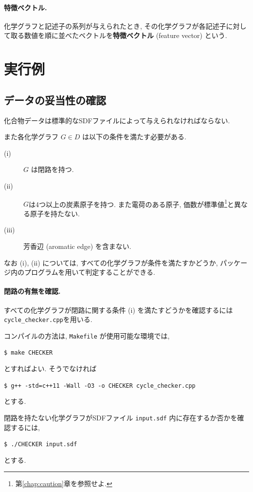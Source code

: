 \documentclass[11pt,titlepage,dvipdfmx,twoside]{jsbook}
\newcommand{\chapref}[1]{第\ref{chap:#1}章}
\begin{document}
\paragraph{特徴ベクトル.}
化学グラフと記述子の系列が与えられたとき,
その化学グラフが各記述子に対して取る数値を順に並べたベクトルを{\bf 特徴ベクトル} (feature vector)
という. 




\section{実行例}
\label{chap:1quick}

\subsection{データの妥当性の確認}
化合物データは標準的なSDFファイルによって与えられなければならない.

また各化学グラフ $G\in D$ は以下の条件を満たす必要がある.
\begin{description}
\item[(i)] $G$ は閉路を持つ.
\item[(ii)] $G$は4つ以上の炭素原子を持つ.
  また電荷のある原子, 価数が標準値\footnote{\chapref{caution}を参照せよ.}と異なる原子を持たない.
\item[(iii)] 芳香辺 (aromatic edge) を含まない. 
\end{description}
なお (i), (ii) については,
すべての化学グラフが条件を満たすかどうか,
パッケージ内のプログラムを用いて判定することができる. 


\paragraph{閉路の有無を確認.}
すべての化学グラフが閉路に関する条件 (i) を満たすどうかを確認するには 
          {\tt cycle\_checker.cpp}を用いる.

コンパイルの方法は, {\tt Makefile} が使用可能な環境では, 
\begin{oframed}
{\small
\verb|$ make CHECKER|
}
\end{oframed}
とすればよい. そうでなければ
\begin{oframed}
{\small
\verb|$ g++ -std=c++11 -Wall -O3 -o CHECKER cycle_checker.cpp|
}
\end{oframed}
とする.

閉路を持たない化学グラフがSDFファイル
{\tt input.sdf} 内に存在するか否かを確認するには,
\begin{oframed}
{\small
\verb|$ ./CHECKER input.sdf|
}
\end{oframed}
とする.
\end{document}
